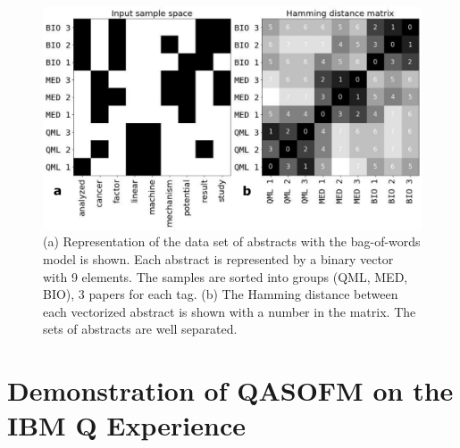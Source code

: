 \documentclass[pra,showkeys,twocolumn,showpacs]{revtex4-1}
\begin{document}
%

\begin{figure}[t]
	\label{fig:vectorized_sample}
	\includegraphics[width=0.95\columnwidth]{vectorized_sample.png}
	\caption{
		(a) Representation of the data set of abstracts with the bag-of-words model is shown. 
		Each abstract is represented by a binary vector with 9 elements. 
		The samples are sorted into groups (QML, MED, BIO), 3 papers for each tag.  
		(b) The Hamming distance between each vectorized abstract is shown with a number in the matrix. 
		The sets of abstracts are well separated.
	} 
\end{figure}



















\section{Demonstration of QASOFM on the IBM Q Experience}
\end{document}
